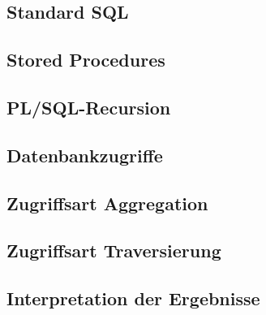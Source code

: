 \subsection{Standard SQL}
\subsection{Stored Procedures}
\subsection{PL/SQL-Recursion}
\subsection{Datenbankzugriffe}
\subsection{Zugriffsart Aggregation}
\subsection{Zugriffsart Traversierung}
\subsection{Interpretation der Ergebnisse}
